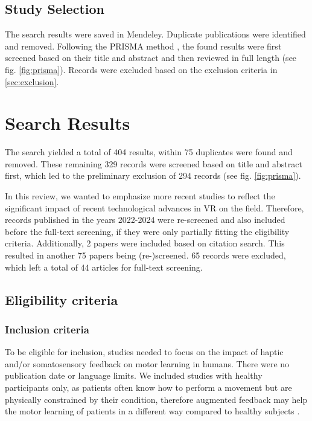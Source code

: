 \subsection{Study Selection}
The search results were saved in Mendeley. Duplicate publications were identified and removed. Following the PRISMA method \cite{Page2021TheReviews}, the found results were first screened based on their title and abstract and then reviewed in full length (see fig. \ref{fig:prisma}). Records were excluded based on the exclusion criteria in \ref{sec:exclusion}.


\section{Search Results}

The search yielded a total of 404 results, within 75 duplicates were found and removed. These remaining 329 records were screened based on title and abstract first, which led to the preliminary exclusion of 294 records (see fig. \ref{fig:prisma}). 


In this review, we wanted to emphasize more recent studies to reflect the significant impact of recent technological advances in VR on the field. Therefore, records published in the years 2022-2024 were re-screened and also included before the full-text screening, if they were only partially fitting the eligibility criteria. Additionally, 2 papers were included based on citation search. This resulted in another 75 papers being (re-)screened. 65 records were excluded, which left a total of 44 articles for full-text screening.




\subsection{Eligibility criteria}
\label{sec:eligibility}
\subsubsection{Inclusion criteria}
To be eligible for inclusion, studies needed to focus on the impact of haptic and/or somatosensory feedback on motor learning in humans. There were no publication date or language limits. We included studies with healthy participants only, as patients often know how to perform a movement but are physically constrained by their condition, therefore augmented feedback may help the motor learning of patients in a different way compared to healthy subjects \cite{Sigrist2013AugmentedReview}.

